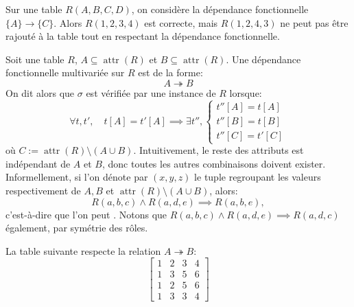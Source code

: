\documentclass[french, toc]{../cs-classes/cs-classes}
\DeclareMathOperator{\attr}{attr}
\begin{document}
\begin{exemple}
    Sur une table $R(A, B, C, D)$, on considère la dépendance fonctionnelle $\{A\} \to \{C\}$. Alors $R(1, 2, 3, 4)$ est correcte, mais $R(1, 2, 4, 3)$ ne peut pas être rajouté à la table tout en respectant la dépendance fonctionnelle.
\end{exemple}

\begin{definition}
    Soit une table $R$, $A\subseteq\attr(R)$ et $B\subseteq\attr(R)$. Une dépendance fonctionnelle multivariée sur $R$ est de la forme:
    \begin{equation*}
        A \twoheadrightarrow B
    \end{equation*}
    On dit alors que $\sigma$ est vérifiée par une instance de $R$ lorsque:
    \begin{equation*}
        \forall t, t', \quad t[A]=t'[A] \implies \exists t'', \begin{cases}
            t''[A]=t[A]\\
            t''[B]=t[B] \\
            t''[C]= t'[C]
        \end{cases}
    \end{equation*}
    où $C:=\attr(R)\setminus (A\cup B)$. Intuitivement, le reste des attributs est indépendant de $A$ et $B$, donc toutes les autres combinaisons doivent exister. Informellement, si l'on dénote par $(x, y, z)$ le tuple regroupant les valeurs respectivement de $A, B$ et $\attr(R)\setminus (A\cup B)$, alors:
    \begin{equation*}
        R(a, b, c) \land R(a, d, e) \implies R(a, b, e),
    \end{equation*}
    c'est-à-dire que l'on peut . Notons que $R(a, b, c) \land R(a, d, e) \implies R(a, d, c)$ également, par symétrie des rôles.
\end{definition}

\begin{exemple}
    La table suivante respecte la relation $A \twoheadrightarrow B$:
    \begin{equation*}
        \begin{bmatrix}
            1&2&3&4\\
            1&3&5&6\\
            1&2&5&6\\
            1&3&3&4
        \end{bmatrix}
    \end{equation*}
\end{exemple}
\end{document}
